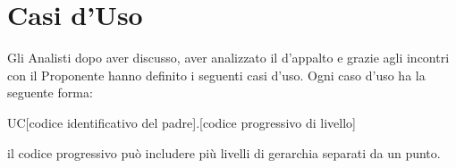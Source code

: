 \section{Casi d'Uso}
\label{sec:CasiUso}
Gli Analisti dopo aver discusso, aver analizzato il  d'appalto e grazie agli incontri con il Proponente hanno definito i seguenti casi d'uso.
Ogni caso d'uso ha la seguente forma:
\begin{center}
	UC[codice identificativo del padre].[codice progressivo di livello]
\end{center}
il codice progressivo può includere più livelli di gerarchia separati da un punto.